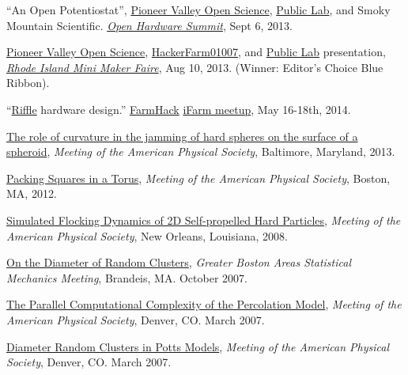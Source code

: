 \documentclass[10pt]{article}
\begin{document}
\begin{bibenum}

\item ``An Open Potentiostat'', \href{http://pvos.org}{Pioneer Valley Open Science}, \href{http://publiclab.org}{Public Lab}, and Smoky Mountain Scientific. \href{http://2013.oshwa.org/}{\emph{Open Hardware Summit}}, Sept 6, 2013.  

\item \href{http://pvos.org}{Pioneer Valley Open Science}, \href{http://hackerfarm01007.org}{HackerFarm01007}, and \href{http://publiclab.org}{Public Lab} presentation, \href{http://makerfaireri.com/}{\emph{Rhode Island Mini Maker Faire}}, Aug 10, 2013.  (Winner: Editor's Choice Blue Ribbon). 

\item ``\href{http://publiclab.org/wiki/riffle}{Riffle} hardware design.'' \href{http://farmhack.net}{FarmHack} \href{http://publiclab.org/notes/dorncox/05-10-2014/ifarm-2014}{iFarm meetup}, May 16-18th, 2014. 

\item  \href{http://meetings.aps.org/Meeting/MAR13/Session/W29.11}{The role of curvature in the jamming of hard spheres on the surface of a spheroid}, \emph{Meeting of the American Physical Society}, Baltimore, Maryland, 2013.

\item \href{http://meetings.aps.org/Meeting/MAR12/Session/P53.8}{Packing Squares in a Torus}, \emph{Meeting of the American Physical Society}, Boston, MA, 2012.

\item \href{http://meetings.aps.org/Meeting/MAR08/Session/B39.11}{Simulated Flocking Dynamics of 2D Self-propelled Hard Particles}, \emph{Meeting of the American Physical Society}, New Orleans, Louisiana, 2008. 

\item \href{http://physics.clarku.edu/gbasm/fall2007/}{On the Diameter of Random Clusters}, \emph{Greater Boston Areas Statistical Mechanics Meeting}, Brandeis, MA. October 2007.

\item \href{http://meetings.aps.org/Meeting/MAR07/Event/57451}{The Parallel Computational Complexity of the Percolation Model}, \emph{Meeting of the American Physical Society}, Denver, CO. March 2007.

\item \href{http://meetings.aps.org/Meeting/MAR07/Session/H22.7}{Diameter Random Clusters in Potts Models}, \emph{Meeting of the American Physical Society}, Denver, CO. March 2007.


\end{bibenum}
\end{document}
